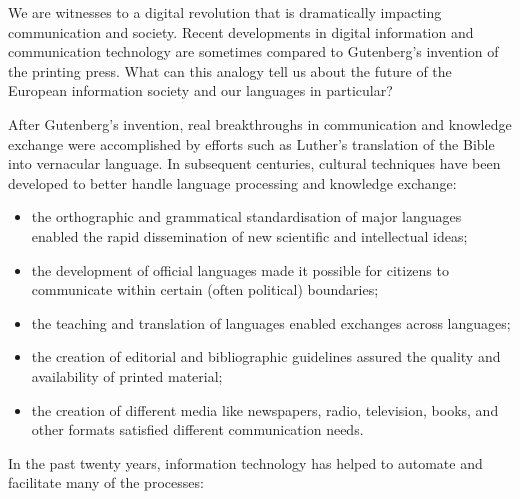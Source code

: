 \clearpage


\begin{multicols}{2}

We are witnesses to a digital revolution that is dramatically impacting communication and society.
Recent developments in digital information and communication technology are sometimes compared to Gutenberg's invention of the printing press.
What can this analogy tell us about the future of the European information society and our languages in particular?


After Gutenberg's invention, real breakthroughs in communication and knowledge exchange were accomplished by efforts such as Luther's translation of the Bible into vernacular language.
In subsequent centuries, cultural techniques have been developed to better handle language processing and knowledge exchange:

\begin{itemize}
\item  the orthographic and grammatical standardisation of major languages enabled the rapid dissemination of new scientific and intellectual ideas;
\item  the development of official languages made it possible for citizens to communicate within certain (often political) boundaries;
\item  the teaching and translation of languages enabled exchanges across languages;
\item  the creation of editorial and bibliographic guidelines assured the quality and availability of printed material;
\item  the creation of different media like newspapers, radio, television, books, and other formats satisfied different communication needs. 
\end{itemize}

In the past twenty years, information technology has helped to automate and facilitate many of the processes:


\end{multicols}
